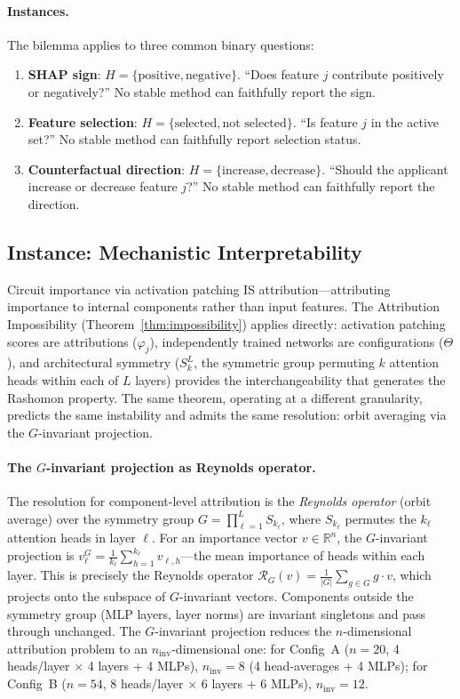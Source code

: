 \documentclass{article}
\begin{document}
\paragraph{Instances.}
The bilemma applies to three common binary questions:
\begin{enumerate}
\item \textbf{SHAP sign}: $H = \{\text{positive}, \text{negative}\}$. ``Does feature $j$ contribute positively or negatively?'' No stable method can faithfully report the sign.
\item \textbf{Feature selection}: $H = \{\text{selected}, \text{not selected}\}$. ``Is feature $j$ in the active set?'' No stable method can faithfully report selection status.
\item \textbf{Counterfactual direction}: $H = \{\text{increase}, \text{decrease}\}$. ``Should the applicant increase or decrease feature $j$?'' No stable method can faithfully report the direction.
\end{enumerate}

\subsection{Instance: Mechanistic Interpretability}
\label{sec:mech-interp}

Circuit importance via activation patching IS attribution---attributing importance to internal components rather than input features. The Attribution Impossibility (Theorem~\ref{thm:impossibility}) applies directly: activation patching scores are attributions ($\varphi_j$), independently trained networks are configurations ($\Theta$), and architectural symmetry ($S_k^L$, the symmetric group permuting $k$ attention heads within each of $L$ layers) provides the interchangeability that generates the Rashomon property. The same theorem, operating at a different granularity, predicts the same instability and admits the same resolution: orbit averaging via the $G$-invariant projection.

\paragraph{The $G$-invariant projection as Reynolds operator.}
The resolution for component-level attribution is the \emph{Reynolds operator} (orbit average) over the symmetry group $G = \prod_{\ell=1}^{L} S_{k_\ell}$, where $S_{k_\ell}$ permutes the $k_\ell$ attention heads in layer $\ell$. For an importance vector $v \in \mathbb{R}^n$, the $G$-invariant projection is $v^G_\ell = \frac{1}{k_\ell} \sum_{h=1}^{k_\ell} v_{\ell,h}$---the mean importance of heads within each layer. This is precisely the Reynolds operator $\mathcal{R}_G(v) = \frac{1}{|G|} \sum_{g \in G} g \cdot v$, which projects onto the subspace of $G$-invariant vectors. Components outside the symmetry group (MLP layers, layer norms) are invariant singletons and pass through unchanged. The $G$-invariant projection reduces the $n$-dimensional attribution problem to an $n_{\text{inv}}$-dimensional one: for Config~A ($n=20$, 4 heads/layer $\times$ 4 layers + 4 MLPs), $n_{\text{inv}} = 8$ (4 head-averages + 4 MLPs); for Config~B ($n=54$, 8 heads/layer $\times$ 6 layers + 6 MLPs), $n_{\text{inv}} = 12$.
\end{document}
